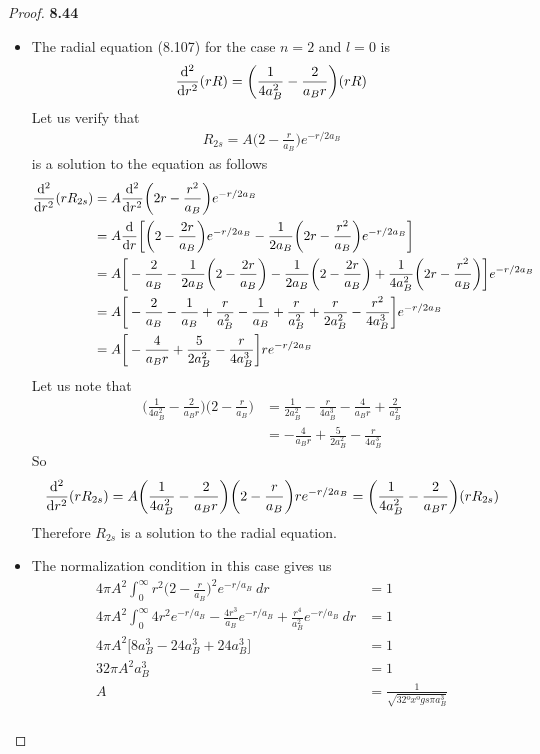 \documentclass[11pt]{article}
\theoremstyle{definition}
\begin{document}
\cleardoublepage
\begin{proof}{\textbf{8.44}}
\begin{itemize}
\item [\textbf{(a)}] The radial equation (8.107) for the case $n = 2$ and
$l = 0$ is
\begin{align*}
    \dv[2]{r}(rR) = \bigg(\frac{1}{4a_B^2} - \frac{2}{a_B r}\bigg)(rR)
\end{align*}
Let us verify that
\begin{align*}
    R_{2s} = A\bigg(2 - \frac{r}{a_B}\bigg)e^{-r/2a_B}
\end{align*}
is a solution to the equation as follows
\begin{align*}
    \dv[2]{r}(rR_{2s})
    &= A\dv[2]{r}\bigg(2r - \frac{r^2}{a_B}\bigg)e^{-r/2a_B}\\
    &= A\dv{r}\bigg[\bigg(2 - \frac{2r}{a_B}\bigg)e^{-r/2a_B}
    - \frac{1}{2a_B}\bigg(2r - \frac{r^2}{a_B}\bigg)e^{-r/2a_B}\bigg]\\
    &= A\bigg[-\frac{2}{a_B}
    - \frac{1}{2a_B}\bigg(2 - \frac{2r}{a_B}\bigg)
    - \frac{1}{2a_B}\bigg(2 - \frac{2r}{a_B}\bigg)
    + \frac{1}{4a_B^2}\bigg(2r - \frac{r^2}{a_B}\bigg)\bigg]e^{-r/2a_B}\\
    &= A\bigg[-\frac{2}{a_B}
    - \frac{1}{a_B} + \frac{r}{a_B^2}
    - \frac{1}{a_B} + \frac{r}{a_B^2}
    + \frac{r}{2a_B^2} - \frac{r^2}{4a_B^3}\bigg]e^{-r/2a_B}\\
    &= A\bigg[-\frac{4}{a_Br} + \frac{5}{2a_B^2}
    - \frac{r}{4a_B^3}\bigg]re^{-r/2a_B}
\end{align*}
Let us note that
\begin{align*}
    \bigg(\frac{1}{4a_B^2} - \frac{2}{a_B r}\bigg)\bigg(2 - \frac{r}{a_B}\bigg)
    &= \frac{1}{2a_B^2} - \frac{r}{4a_B^3} - \frac{4}{a_B r} + \frac{2}{a_B^2}\\
    &= - \frac{4}{a_B r} + \frac{5}{2a_B^2} - \frac{r}{4a_B^3}
\end{align*}
So
\begin{align*}
    \dv[2]{r}(rR_{2s})
    = A\bigg(\frac{1}{4a_B^2} - \frac{2}{a_B r}\bigg)
    \bigg(2 - \frac{r}{a_B}\bigg)re^{-r/2a_B}
    = \bigg(\frac{1}{4a_B^2} - \frac{2}{a_B r}\bigg)(rR_{2s})
\end{align*}
Therefore $R_{2s}$ is a solution to the radial equation.
\item [\textbf{(b)}] The normalization condition in this case gives us
\begin{align*}
    4\pi A^2 \int_0^\infty r^2\bigg(2 - \frac{r}{a_B}\bigg)^2e^{-r/a_B}~dr &= 1\\
    4\pi A^2 \int_0^\infty
    4r^2e^{-r/a_B} - \frac{4r^3}{a_B}e^{-r/a_B}
    + \frac{r^4}{a_B^2}e^{-r/a_B}~dr &= 1\\
    4\pi A^2 \bigg[8a_B^3 - 24a_B^3 + 24 a_B^3\bigg] &= 1\\
    32\pi A^2 a_B^3 &= 1\\
    A &= \frac{1}{\sqrt{32ºxºgs\pi a_B^3}}\\
\end{align*}
\end{itemize}
\end{proof}
\end{document}
